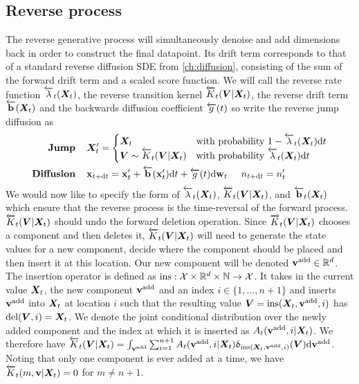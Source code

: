 \subsection{Reverse process}
The reverse generative process will simultaneously denoise and add dimensions back in order to construct the final datapoint. Its drift term corresponds to that of a standard reverse diffusion SDE from \cref{ch:diffusion}, consisting of the sum of the forward drift term and a scaled score function. We will call the reverse rate function $\overleftarrow{\lambda}_t({\bm{X}}_t)$, the reverse transition kernel $\overleftarrow{K}_t({\bm{V}} | {\bm{X}}_t)$, the reverse drift term $\overleftarrow{\mathbf{b}}({\bm{X}}_t)$ and the backwards diffusion coefficient $\overleftarrow{g}(t)$ so write the reverse jump diffusion as
\begin{align}
    \label{eq:tddm-reverse-jump}
    \textbf{Jump} \hspace{.4cm} & {\bm{X}}_t' = \begin{cases}
        {\bm{X}}_t & \text{with probability } 1 - \overleftarrow{\lambda}_t({\bm{X}}_t) \mathrm{d} t \\
        {\bm{V}} \sim \overleftarrow{K}_t( {\bm{V}} |{\bm{X}}_t) & \text{with probability } \overleftarrow{\lambda}_t({\bm{X}}_t) \mathrm{d} t
    \end{cases} 
    \\
    \label{eq:tddm-reverse-diffusion}
    \textbf{Diffusion} \hspace{.4cm} &{\mathbf{x}}_{t+ \mathrm{d} t} = {\mathbf{x}}'_t + \overleftarrow{\mathbf{b}}({\mathbf{x}}'_t)
    \mathrm{d} t + \overleftarrow{g}(t) \mathrm{d} \mathbf{w}_t \hspace{.5cm} n_{t+\mathrm{d} t} = n_t'
\end{align}
We would now like to specify the form of $\overleftarrow{\lambda}_t({\bm{X}}_t)$, $\overleftarrow{K}_t({\bm{V}}|{\bm{X}}_t)$, and $\overleftarrow{\mathbf{b}}_t({\bm{X}}_t)$ which ensure that the reverse process is the time-reversal of the forward process. 
$\overleftarrow{K}_t({\bm{V}} | {\bm{X}}_t)$ should undo the forward deletion operation. Since $\overrightarrow{K}_t({\bm{V}} | {\bm{X}}_t)$ chooses a component and then deletes it, $\overleftarrow{K}_t({\bm{V}} | {\bm{X}}_t)$ will need to generate the state values for a new component, decide where the component should be placed and then insert it at this location. 
Our new component will be denoted ${\mathbf{v}}^{\textup{add}} \in \mathbb{R}^{d}$. 
The insertion operator is defined as $\text{ins}: {\mathcal{X}} \times \mathbb{R}^{d} \times \mathbb{N} \rightarrow {\mathcal{X}}$. It takes in the current value ${\bm{X}}_t$, the new component ${\mathbf{v}}^{\textup{add}}$ and an index $i \in \{1, \dots, n+1\}$ and inserts ${\mathbf{v}}^{\textup{add}}$ into ${\bm{X}}_t$ at location $i$ such that the resulting value ${\bm{V}} = \text{ins}({\bm{X}}_t, {\mathbf{v}}^{\textup{add}}, i)$ has $\text{del}({\bm{V}}, i) = {\bm{X}}_t$.
We denote the joint conditional distribution over the newly added component and the index at which it is inserted as $A_t({\mathbf{v}}^{\textup{add}}, i | {\bm{X}}_t)$.
We therefore have $\overleftarrow{K}_t({\bm{V}} | {\bm{X}}_t) = \int_{{\mathbf{v}}^{\textup{add}}} \sum_{i=1}^{n+1}  A_t({\mathbf{v}}^{\textup{add}}, i | {\bm{X}}_t) \updelta_{\text{ins}({\bm{X}}_t, {\mathbf{v}}^{\textup{add}}, i)}({\bm{V}}) \mathrm{d} {\mathbf{v}}^{\textup{add}}$. Noting that only one component is ever added at a time, we have $\overleftarrow{K}_t(m, {\mathbf{v}} | {\bm{X}}_t) = 0$ for $m \neq n+1$. 

